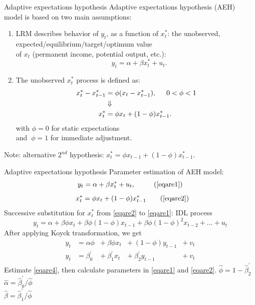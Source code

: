 \documentclass{beamer}
\begin{document}
\begin{frame}{Adaptive expectations hypothesis}
Adaptive expectations hypothesis (AEH) \\ model is based on two main assumptions:
\bigskip
\begin{enumerate}
\item LRM describes behavior of $y_t$, as a function of ${x}_t^\ast$: the unobserved, 
expected/equilibrium/target/optimum value \\of $x_t$ 
(permanent income, potential output, etc.):
\begin{equation}
~~~~y_t = \alpha + \beta x_t^\ast + u_t.\label{eqare1}
\end{equation}
\item The unobserved ${x}_t^\ast$ process is defined as:
\begin{equation} \label{eqare2}
\begin{aligned}
x^\ast_t - x^\ast_{t-1} & = \phi( x_t - x_{t-1}^\ast), \hspace{0.5cm} 0 < \phi < 1\\
 &  \Downarrow \\
x_t^\ast & =  \phi x_t + (1-\phi) x^\ast_{t-1}.
\end{aligned}
\end{equation}
with $\phi=0$ for static expectations\\ and $~\phi=1$ for immediate adjustment.
\end{enumerate}
\footnotesize{Note: alternative $2^{nd}$ hypothesis: $x_t^\ast =  \phi x_{t-1} + (1-\phi) x^\ast_{t-1}. $}
\end{frame}
\begin{frame}{Adaptive expectations hypothesis}
Parameter estimation of AEH model:
\begin{equation}
y_t = \alpha + \beta x_t^\ast + u_t,~~ \tag{\ref{eqare1}}
\end{equation}
\begin{equation}
~~x_t^\ast =  \phi x_t + (1-\phi) x^\ast_{t-1} \tag{\ref{eqare2}}
\end{equation}
Successive substitution for $x_t^\ast$ from \eqref{eqare2} to \eqref{eqare1}: IDL process
\begin{equation}
y_t = \alpha + \beta \phi x_{t} 
    + \beta \phi (1-\phi)x_{t-1} + \beta \phi (1 - \phi)^2 x_{t-2} + \dots + u_t \label{eqare3}
 \end{equation}
After applying Koyck transformation, we get
\begin{equation} \label{eqare4}
\begin{aligned}
y_t &= \alpha \phi &+~ \beta \phi x_{t} &+~ (1-\phi) y_{t-1} &+~ v_t \\
y_t &= \beta_0^{\prime} &+~ \beta_1^{\prime} x_{t} &+~ \beta_2^{\prime} y_{t-1} &+~ v_t
\end{aligned}
\end{equation}
Estimate \eqref{eqare4}, then calculate parameters in \eqref{eqare1} and \eqref{eqare2}.
\smallskip
$\hat{\phi}= 1-\hat{\beta}_2^{\prime}$\\
\smallskip
$\hat{\alpha} =\hat{\beta}_0^{\prime}/\hat{\phi}$\\
\smallskip
$\hat{\beta} =\hat{\beta}_1^{\prime}/\hat{\phi}$
\end{frame}
\end{document}
